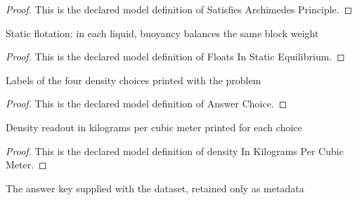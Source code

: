 \begin{proof}
  This is the declared model definition of Satisfies Archimedes Principle.
\end{proof}
\begin{definition}
  \label{def:physics:phyx-mini-0723:phyxminiproblems-problemphyxmini0723-floatsinstaticequilibrium}
  Static flotation: in each liquid, buoyancy balances the same block weight
\end{definition}
\begin{proof}
  This is the declared model definition of Floats In Static Equilibrium.
\end{proof}
\begin{definition}
  \label{def:physics:phyx-mini-0723:phyxminiproblems-problemphyxmini0723-answerchoice}
  Labels of the four density choices printed with the problem
\end{definition}
\begin{proof}
  This is the declared model definition of Answer Choice.
\end{proof}
\begin{definition}
  \label{def:physics:phyx-mini-0723:phyxminiproblems-problemphyxmini0723-answerchoice-densityinkilogramspercubicmeter}
  Density readout in kilograms per cubic meter printed for each choice
\end{definition}
\begin{proof}
  This is the declared model definition of density In Kilograms Per Cubic Meter.
\end{proof}
\begin{definition}
  \label{def:physics:phyx-mini-0723:phyxminiproblems-problemphyxmini0723-recordedanswerchoice}
  The answer key supplied with the dataset, retained only as metadata
\end{definition}
